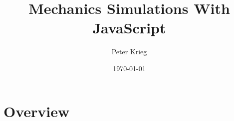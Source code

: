 \documentclass{beamer}
\title[]{Mechanics Simulations With JavaScript} %
\author[]{Peter Krieg} %
\institute[Bates College] %
{
Physics Fall Semester Thesis \\ %

\medskip
}
\date{\today} %
\begin{document}
\begin{frame}
\titlepage %
\end{frame}



\section{Overview} %


%
%
%
\end{document}
